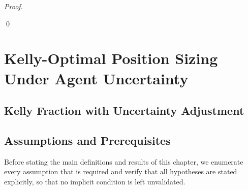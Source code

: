 \documentclass[12pt,openany]{book}
\numberwithin{equation}{chapter}
\theoremstyle{plain}
\theoremstyle{definition}
\theoremstyle{remark}
\numberwithin{equation}{chapter}
\theoremstyle{plain}
\begin{document}
\begin{proof}
\begin{enumerate}
\end{enumerate}
\qed
\end{proof}

\chapter{Kelly-Optimal Position Sizing Under Agent Uncertainty}
\label{ch:kelly}

\section{Kelly Fraction with Uncertainty Adjustment}

\section{Assumptions and Prerequisites}

Before stating the main definitions and results of this chapter,
we enumerate every assumption that is required and verify that all
hypotheses are stated explicitly, so that no implicit condition is
left unvalidated.
\end{document}

